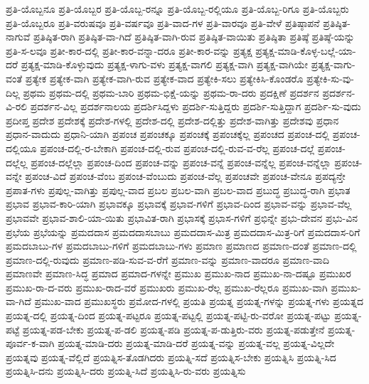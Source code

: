 {ಪ್ರತಿ-ಯೊಬ್ಬನೂ
ಪ್ರತಿ-ಯೊಬ್ಬರ
ಪ್ರತಿ-ಯೊಬ್ಬ-ರನ್ನೂ
ಪ್ರತಿ-ಯೊಬ್ಬ-ರಲ್ಲಿಯೂ
ಪ್ರತಿ-ಯೊಬ್ಬ-ರಿಗೂ
ಪ್ರತಿ-ಯೊಬ್ಬರು
ಪ್ರತಿ-ಯೊಬ್ಬರೂ
ಪ್ರತಿ-ವರುಷವೂ
ಪ್ರತಿ-ವರ್ಷವೂ
ಪ್ರತಿ-ವಾದ-ಗಳ
ಪ್ರತಿ-ವಾರವೂ
ಪ್ರತಿ-ವೇಳೆ
ಪ್ರತಿಷ್ಠಾಪನೆ
ಪ್ರತಿಷ್ಠಿತ-ನಾಗುವೆ
ಪ್ರತಿಷ್ಠಿತ-ರಾಗಿ
ಪ್ರತಿಷ್ಠಿತ-ವಾ-ಗಿದೆ
ಪ್ರತಿಷ್ಠಿತ-ವಾಗಿ-ರುವ
ಪ್ರತಿಷ್ಠಿತ-ವಾಯಿತು
ಪ್ರತಿಷ್ಠಿತಾ
ಪ್ರತಿಷ್ಠೆ
ಪ್ರತಿಷ್ಠೆ-ಯನ್ನು
ಪ್ರತಿ-ಸ-ಲವೂ
ಪ್ರತೀ-ಕಾರ-ದಲ್ಲಿ
ಪ್ರತೀ-ಕಾರ-ವನ್ನಾ-ದರೂ
ಪ್ರತೀ-ಕಾರ-ವನ್ನು
ಪ್ರತ್ಯಕ್ಷ
ಪ್ರತ್ಯಕ್ಷ-ಮಾಡಿ-ಕೊಳ್ಳ-ಬಲ್ಲೆ-ಯಾ-ದರೆ
ಪ್ರತ್ಯಕ್ಷ-ಮಾಡಿ-ಕೊಳ್ಳುವುದು
ಪ್ರತ್ಯಕ್ಷ-ಳಾಗು-ವಳು
ಪ್ರತ್ಯಕ್ಷ-ವಾಗಲಿ
ಪ್ರತ್ಯಕ್ಷ-ವಾಗಿ
ಪ್ರತ್ಯಕ್ಷ-ವಾಗಿಯೇ
ಪ್ರತ್ಯಕ್ಷ-ವಾಗು-ವಂತೆ
ಪ್ರತ್ಯೇಕ
ಪ್ರತ್ಯೇಕ-ವಾಗಿ
ಪ್ರತ್ಯೇಕ-ವಾಗಿ-ರುವ
ಪ್ರತ್ಯೇಕ-ವಾದ
ಪ್ರತ್ಯೇಕಿ-ಸಲು
ಪ್ರತ್ಯೇಕಿಸಿ-ಕೊಂಡರೊ
ಪ್ರತ್ಯೇಕಿ-ಸು-ವು-ದಿಲ್ಲ
ಪ್ರಥಮ
ಪ್ರಥಮ-ದಲ್ಲಿ
ಪ್ರಥಮ-ಬಾರಿ
ಪ್ರಥಮ-ಭಿಕ್ಷೆ-ಯನ್ನು
ಪ್ರಥಮ-ರಾ-ದರು
ಪ್ರದಕ್ಷಿಣೆ
ಪ್ರದರ್ಶನ
ಪ್ರದರ್ಶನ-ವಿ-ರಲಿ
ಪ್ರದರ್ಶನ-ವಿಲ್ಲ
ಪ್ರದರ್ಶನಾಲಯ
ಪ್ರದರ್ಶಿಸಿದ್ದಳು
ಪ್ರದರ್ಶಿ-ಸುತ್ತಿದ್ದರು
ಪ್ರದರ್ಶಿ-ಸುತ್ತಿದ್ದಾಗ
ಪ್ರದರ್ಶಿ-ಸು-ವುದು
ಪ್ರದೀಪ್ತ
ಪ್ರದೇಶ
ಪ್ರದೇಶಕ್ಕೆ
ಪ್ರದೇಶ-ಗಳಲ್ಲಿ
ಪ್ರದೇಶ-ದಲ್ಲಿ
ಪ್ರದೇಶ-ದಲ್ಲಿತ್ತು
ಪ್ರದೇಶ-ವಾಗಿತ್ತು
ಪ್ರದೇಶವು
ಪ್ರಧಾನ
ಪ್ರಧಾನ-ವಾದುದು
ಪ್ರಧಾನಿ-ಯಾಗಿ
ಪ್ರಪಂಚ
ಪ್ರಪಂಚಕ್ಕೂ
ಪ್ರಪಂಚಕ್ಕೆ
ಪ್ರಪಂಚಕ್ಕೆಲ್ಲ
ಪ್ರಪಂಚದ
ಪ್ರಪಂಚ-ದಲ್ಲಿ
ಪ್ರಪಂಚ-ದಲ್ಲಿಯೂ
ಪ್ರಪಂಚ-ದಲ್ಲಿ-ರ-ಬೇಕಾಗಿ
ಪ್ರಪಂಚ-ದಲ್ಲಿ-ರುವ
ಪ್ರಪಂಚ-ದಲ್ಲಿ-ರುವ-ವ-ರೆಲ್ಲ
ಪ್ರಪಂಚ-ದಲ್ಲೆ
ಪ್ರಪಂಚ-ದಲ್ಲೆಲ್ಲ
ಪ್ರಪಂಚ-ದಲ್ಲೆಲ್ಲಾ
ಪ್ರಪಂಚ-ದಿಂದ
ಪ್ರಪಂಚ-ವನ್ನು
ಪ್ರಪಂಚ-ವನ್ನೆ
ಪ್ರಪಂಚ-ವನ್ನೆಲ್ಲ
ಪ್ರಪಂಚ-ವನ್ನೆಲ್ಲಾ
ಪ್ರಪಂಚ-ವನ್ನೇ
ಪ್ರಪಂಚ-ವಿದೆ
ಪ್ರಪಂಚ-ವೆಂಬ
ಪ್ರಪಂಚ-ವೆಂಬುದು
ಪ್ರಪಂಚ-ವೆಲ್ಲ
ಪ್ರಪಂಚವೇ
ಪ್ರಪಂಚ-ವೇನೂ
ಪ್ರಪದ್ಯನ್ತೇ
ಪ್ರಪಾತ-ಗಳು
ಪ್ರಪುಲ್ಲ-ವಾಗಿತ್ತು
ಪ್ರಪುಲ್ಲ-ವಾದ
ಪ್ರಬಲ
ಪ್ರಬಲ-ವಾಗಿ
ಪ್ರಬಲ-ವಾದ
ಪ್ರಬುದ್ಧ
ಪ್ರಬುದ್ಧ-ರಾಗಿ
ಪ್ರಭಾತ
ಪ್ರಭಾವ
ಪ್ರಭಾವ-ಕಾರಿ-ಯಾಗಿ
ಪ್ರಭಾವಕ್ಕೂ
ಪ್ರಭಾವಕ್ಕೆ
ಪ್ರಭಾವ-ಗಳಿಗೆ
ಪ್ರಭಾವ-ದಿಂದ
ಪ್ರಭಾವ-ವನ್ನು
ಪ್ರಭಾವ-ವೆಲ್ಲ
ಪ್ರಭಾವವೇ
ಪ್ರಭಾವ-ಶಾಲಿ-ಯಾ-ಯಿತು
ಪ್ರಭಾವಿತ-ರಾಗಿ
ಪ್ರಭಾಸಕ್ಕೆ
ಪ್ರಭಾಸ-ಗಳಿಗೆ
ಪ್ರಭಿನ್ನೇ
ಪ್ರಭು-ದೇವನ
ಪ್ರಭು-ವಿನ
ಪ್ರಭೆಯ
ಪ್ರಭೆಯನ್ನು
ಪ್ರಮದದಾಸ
ಪ್ರಮದದಾಸಬಾಬು
ಪ್ರಮದದಾಸ-ಮಿತ್ರ
ಪ್ರಮದದಾಸ-ಮಿತ್ರ-ರಿಗೆ
ಪ್ರಮದದಾಸ-ರಿಗೆ
ಪ್ರಮದಬಾಬು-ಗಳ
ಪ್ರಮದಬಾಬು-ಗಳಿಗೆ
ಪ್ರಮದಬಾಬು-ಗಳು
ಪ್ರಮಾಣ
ಪ್ರಮಾಣದ
ಪ್ರಮಾಣ-ದಂತೆ
ಪ್ರಮಾಣ-ದಲ್ಲಿ
ಪ್ರಮಾಣ-ದಲ್ಲಿ-ರುವುದು
ಪ್ರಮಾಣ-ಪಡಿ-ಸುವ-ವ-ರೆಗೆ
ಪ್ರಮಾಣ-ವನ್ನು
ಪ್ರಮಾಣ-ವಾದರೂ
ಪ್ರಮಾಣ-ವಾದಿ
ಪ್ರಮಾಣವೇ
ಪ್ರಮಾಣ-ಸಿದ್ಧ
ಪ್ರಮಾದ
ಪ್ರಮಾದ-ಗಳನ್ನೇ
ಪ್ರಮುಖ
ಪ್ರಮುಖ-ನಾದ
ಪ್ರಮುಖ-ನಾ-ದಷ್ಟೂ
ಪ್ರಮುಖರ
ಪ್ರಮುಖ-ರಾ-ದ-ವರು
ಪ್ರಮುಖ-ರಾದ-ವರೆ
ಪ್ರಮುಖರು
ಪ್ರಮುಖ-ರೆಲ್ಲ
ಪ್ರಮುಖ-ರೆಲ್ಲರೂ
ಪ್ರಮುಖ-ವಾಗಿ
ಪ್ರಮುಖ-ವಾ-ಗಿದೆ
ಪ್ರಮುಖ-ವಾದ
ಪ್ರಮುಖಸ್ಥರು
ಪ್ರಮೋದ-ಗಳಲ್ಲಿ
ಪ್ರಯತಿ
ಪ್ರಯತ್ನ
ಪ್ರಯತ್ನ-ಗಳನ್ನು
ಪ್ರಯತ್ನ-ಗಳು
ಪ್ರಯತ್ನದ
ಪ್ರಯತ್ನ-ದಲ್ಲಿ
ಪ್ರಯತ್ನ-ದಿಂದ
ಪ್ರಯತ್ನ-ಪಟ್ಟರೂ
ಪ್ರಯತ್ನ-ಪಟ್ಟಲ್ಲಿ
ಪ್ರಯತ್ನ-ಪಟ್ಟಿ-ರು-ವರೋ
ಪ್ರಯತ್ನ-ಪಟ್ಟು
ಪ್ರಯತ್ನ-ಪಟ್ಟೆ
ಪ್ರಯತ್ನ-ಪಡ-ಬೇಕು
ಪ್ರಯತ್ನ-ಪ-ಡಲಿ
ಪ್ರಯತ್ನ-ಪಡಿ
ಪ್ರಯತ್ನ-ಪ-ಡುತ್ತಿರು-ವರು
ಪ್ರಯತ್ನ-ಪಡುತ್ತೇನೆ
ಪ್ರಯತ್ನ-ಪೂರ್ವ-ಕ-ವಾಗಿ
ಪ್ರಯತ್ನ-ಮಾಡಿ-ದರು
ಪ್ರಯತ್ನ-ಮಾಡಿ-ದರೆ
ಪ್ರಯತ್ನ-ವನ್ನು
ಪ್ರಯತ್ನ-ವಲ್ಲ
ಪ್ರಯತ್ನ-ವಿಲ್ಲದೇ
ಪ್ರಯತ್ನವು
ಪ್ರಯತ್ನ-ವೆಲ್ಲಿದೆ
ಪ್ರಯತ್ನಿಸ-ತೊಡಗಿದರು
ಪ್ರಯತ್ನಿ-ಸದೆ
ಪ್ರಯತ್ನಿಸ-ಬೇಕು
ಪ್ರಯತ್ನಿಸಿ
ಪ್ರಯತ್ನಿ-ಸಿದ
ಪ್ರಯತ್ನಿಸಿ-ದನು
ಪ್ರಯತ್ನಿಸಿ-ದರು
ಪ್ರಯತ್ನಿ-ಸಿದೆ
ಪ್ರಯತ್ನಿಸಿ-ರು-ವರು
ಪ್ರಯತ್ನಿಸು
}

